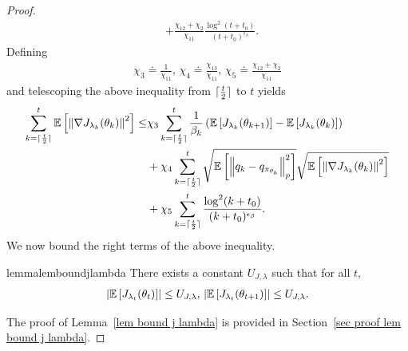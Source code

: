 \documentclass[twoside,11pt]{article}
\DeclarePairedDelimiter{\ceil}{\lceil}{\rceil}
\newcommand{\E}{\mathbb{E}}
\numberwithin{assucounter}{section}
\begin{document}
\begin{proof}
\begin{align}
  &+ \frac{\chi_{12} + \chi_2}{\chi_{11}} \frac{\log^2(t+t_0)}{(t+t_0)^{\epsilon_\beta}}.
\end{align}
Defining
\begin{align}
  \chi_3 \doteq \frac{1}{\chi_{11}}, \, \chi_4 \doteq \frac{\chi_{13}}{\chi_{11}}, \, \chi_5 \doteq \frac{\chi_{12} + \chi_2}{\chi_{11}}
\end{align}
and telescoping the above inequality from $\ceil{\frac{t}{2}}$ to $t$ yields
\begin{align}
  \label{eq tmp 6}
  \sum_{k=\ceil{\frac{t}{2}}}^t \E\left[\norm{ \nabla J_{\lambda_k}(\theta_k)}^2\right] \leq& \chi_3 \sum_{k=\ceil{\frac{t}{2}}}^t \frac{1}{\beta_k} \left(\E\left[J_{\lambda_k}(\theta_{k+1})\right] - \E\left[J_{\lambda_k}(\theta_k)\right]\right) \\
  &+ \chi_4 \sum_{k=\ceil{\frac{t}{2}}}^t \sqrt{\E\left[\norm{q_k - q_{\pi_{\theta_k}}}_p^2 \right]} \sqrt{\E\left[\norm{\nabla J_{\lambda_k}(\theta_k)}^2\right]} \\
  &+ \chi_5 \sum_{k=\ceil{\frac{t}{2}}}^t \frac{\log^2(k+t_0)}{(k+t_0)^{\epsilon_\beta}}. 
\end{align}
We now bound the right terms of the above inequality.
\begin{restatable}{lemma}{lemboundjlambda}
  \label{lem bound j lambda} 
  There exists a constant $U_{J, \lambda}$ such that for all $t$,
  \begin{align}
    \abs{\E\left[J_{\lambda_t}(\theta_{t})\right]} \leq U_{J, \lambda}, \, \abs{\E\left[J_{\lambda_t}(\theta_{t+1})\right]} \leq U_{J, \lambda}.
  \end{align}
\end{restatable}
\noindent
The proof of Lemma~\ref{lem bound j lambda} is provided in Section~\ref{sec proof lem bound j lambda}.


\end{proof}
\end{document}
